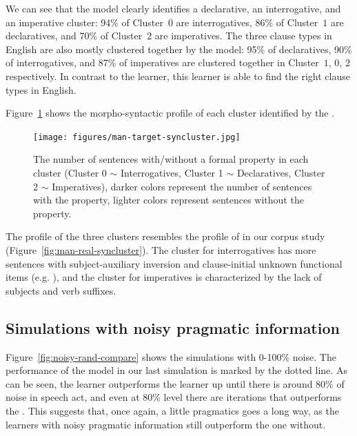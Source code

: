 
We can see that the \plearnerabbr{} model clearly identifies a declarative, an interrogative, and an imperative cluster: 94\% of Cluster~$0$ are interrogatives, 86\% of Cluster~$1$ are declaratives, and 70\% of Cluster~$2$ are imperatives. The three clause types in English are also mostly clustered together by the model: 95\% of declaratives, 90\% of interrogatives, and 87\% of imperatives are clustered together in Cluster~$1$, $0$, $2$ respectively. In contrast to the \dlearnerabbr{} learner, this learner is able to find the right clause types in English.


Figure~\ref{fig:man-target-syncluster} shows the morpho-syntactic profile of each cluster identified by the \plearnerabbr{}. 

\begin{figure}[H]
    \centering
    \texttt{[image: figures/man-target-syncluster.jpg]}
    \caption{The number of sentences with/without a formal property in each cluster (Cluster 0 $\sim$ Interrogatives, Cluster 1 $\sim$ Declaratives, Cluster 2 $\sim$ Imperatives), darker colors represent the number of sentences with the property, lighter colors represent sentences without the property.}
    \label{fig:man-target-syncluster}
\end{figure}

The profile of the three clusters resembles the profile of \diis{} in our corpus study (Figure~\ref{fig:man-real-syncluster}). The cluster for interrogatives has more sentences with subject-auxiliary inversion and clause-initial unknown functional items (e.g. \twh{}), and the cluster for imperatives is characterized by the lack of subjects and verb suffixes. 

\subsection{Simulations with noisy pragmatic information}
\label{sec:mancl:model:results:noisy}

Figure~\ref{fig:noisy-rand-compare} shows the simulations with 0-100\% noise. The performance of the \dlearnerabbr{} model in our last simulation is marked by the dotted line. As can be seen, the \plearnerabbr{} learner outperforms the \dlearnerabbr{} learner up until there is around 80\% of noise in speech act, and even at 80\% level there are iterations that outperforms the \dlearnerabbr{}. This suggests that, once again, a little pragmatics goes a long way, as the learners with noisy pragmatic information still outperform the one without. 

